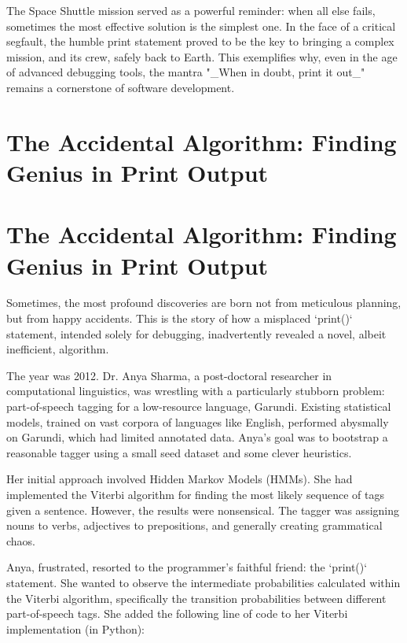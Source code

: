 \documentclass{article}
\begin{document}
{{{{The Space Shuttle mission served as a powerful reminder: when all else fails, sometimes the most effective solution is the simplest one. In the face of a critical segfault, the humble print statement proved to be the key to bringing a complex mission, and its crew, safely back to Earth. This exemplifies why, even in the age of advanced debugging tools, the mantra "_When in doubt, print it out_" remains a cornerstone of software development.

\newpage

\section*{The Accidental Algorithm: Finding Genius in Print Output} %
\label{chapter-8-4-The_Accidental_Algorithm__Finding_Genius}

\section*{The Accidental Algorithm: Finding Genius in Print Output}

Sometimes, the most profound discoveries are born not from meticulous planning, but from happy accidents. This is the story of how a misplaced `print()` statement, intended solely for debugging, inadvertently revealed a novel, albeit inefficient, algorithm.

The year was 2012. Dr. Anya Sharma, a post-doctoral researcher in computational linguistics, was wrestling with a particularly stubborn problem: part-of-speech tagging for a low-resource language, Garundi. Existing statistical models, trained on vast corpora of languages like English, performed abysmally on Garundi, which had limited annotated data. Anya's goal was to bootstrap a reasonable tagger using a small seed dataset and some clever heuristics.

Her initial approach involved Hidden Markov Models (HMMs). She had implemented the Viterbi algorithm for finding the most likely sequence of tags given a sentence. However, the results were nonsensical. The tagger was assigning nouns to verbs, adjectives to prepositions, and generally creating grammatical chaos.

Anya, frustrated, resorted to the programmer's faithful friend: the `print()` statement. She wanted to observe the intermediate probabilities calculated within the Viterbi algorithm, specifically the transition probabilities between different part-of-speech tags. She added the following line of code to her Viterbi implementation (in Python):

}}}}
\end{document}
